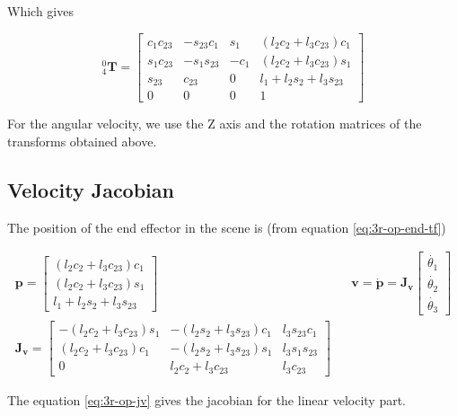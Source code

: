 Which gives

\begin{equation}
    ^{0}_{4}\mathbf{T} = \begin{bmatrix}
        c_1 c_{23} & -s_{23} c_1 & s_1 & (l_2 c_2 + l_3 c_{23})c_1 \\
        s_1 c_{23} & -s_1 s_{23} & -c_1 & (l_2 c_2 + l_3 c_{23})s_1 \\
        s_{23} & c_{23} & 0 & l_1 + l_2s_2 + l_3s_{23} \\
        0 & 0 & 0 & 1
    \end{bmatrix}
    \label{eq:3r-op-end-tf}
\end{equation}

For the angular velocity, we use the Z axis and the rotation matrices of the transforms obtained above.

\subsection{Velocity Jacobian}

The position of the end effector in the scene is (from equation \ref{eq:3r-op-end-tf})

\begin{align}
    \mathbf{p} = \begin{bmatrix}
        (l_2 c_2 + l_3 c_{23})c_1 \\
        (l_2 c_2 + l_3 c_{23})s_1 \\
        l_1 + l_2s_2 + l_3s_{23}
        \end{bmatrix} && \mathbf{v} = \dot{\mathbf{p}} = \mathbf{J_v} \begin{bmatrix}
            \dot{\theta_1} \\ \dot{\theta_2} \\ \dot{\theta_3}
            \end{bmatrix}
    \nonumber \\
    \mathbf{J_v} = \begin{bmatrix}
        -(l_2c_2 + l_3c_{23})s_1 & -(l_2s_2 + l_3s_{23})c_1 & l_3s_{23}c_1 \\
        (l_2c_2 + l_3c_{23})c_1 & -(l_2s_2 + l_3s_{23})s_1 & l_3s_1s_{23} \\
        0 & l_2c_2+l_3c_{23} & l_3 c_{23}
        \end{bmatrix}
    \label{eq:3r-op-jv}
\end{align}

The equation \ref{eq:3r-op-jv} gives the jacobian for the linear velocity part.

